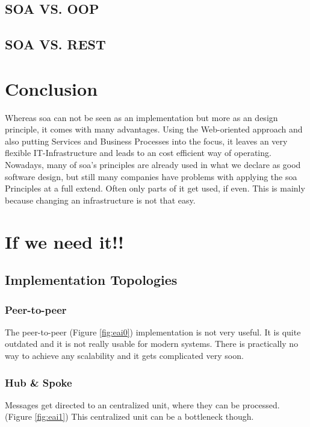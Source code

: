 \documentclass[12pt]{article}
\begin{document}
\subsection{SOA VS. OOP}
\subsection{SOA VS. REST}



\section{Conclusion}
Whereas \gls{soa} can not be seen as an implementation but more as an design principle, it comes with many advantages. Using the Web-oriented approach and also putting Services and Business Processes into the focus, it leaves an very flexible IT-Infrastructure and leads to an cost efficient way of operating.\\
Nowadays, many of \gls{soa}'s principles are already used in what we declare as good software design, but still many companies have problems with applying the \gls{soa} Principles at a full extend. Often only parts of it get used, if even. This is mainly because changing an infrastructure is not that easy. \\


\section{If we need it!!}

\subsection{Implementation Topologies}
\subsubsection{Peer-to-peer}
The peer-to-peer (Figure \ref{fig:eai0}) implementation is not very useful. It is quite outdated and it is not really usable for modern systems.
There is practically no way to achieve any scalability and it gets complicated very soon. 
\subsubsection{Hub \& Spoke}
Messages get directed to an centralized unit, where they can be processed. (Figure \ref{fig:eai1}) This centralized unit can be a bottleneck though. 
\end{document}
